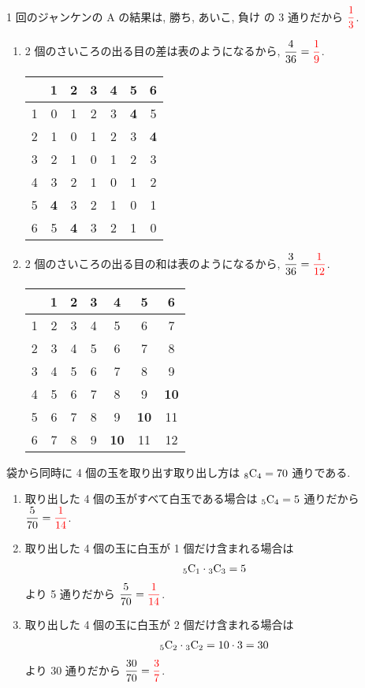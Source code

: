 1 回のジャンケンの A の結果は, 勝ち, あいこ, 負け の 3 通りだから $\textcolor{red}{\dfrac{1}{3}}$.

\begin{enumerate}
	\item{
		2 個のさいころの出る目の差は表のようになるから, $\dfrac{4}{36} = \textcolor{red}{\dfrac{1}{9}}$.
		\begin{table}[H]
			\centering
			\begin{tabular}{c|cccccc}
				  & 1 & 2 & 3 & 4 & 5 & 6 \\ \hline
				1 & 0 & 1 & 2 & 3 & {\textbf{4}} & 5 \\
				2 & 1 & 0 & 1 & 2 & 3 & {\textbf{4}} \\
				3 & 2 & 1 & 0 & 1 & 2 & 3 \\
				4 & 3 & 2 & 1 & 0 & 1 & 2 \\
				5 & {\textbf{4}} & 3 & 2 & 1 & 0 & 1 \\
				6 & 5 & {\textbf{4}} & 3 & 2 & 1 & 0
			\end{tabular}
		\end{table}
	}
	\item{
		2 個のさいころの出る目の和は表のようになるから, $\dfrac{3}{36} = \textcolor{red}{\dfrac{1}{12}}$.
		\begin{table}[H]
			\centering
			\begin{tabular}{c|cccccc}
				  & 1 & 2 & 3 & 4 & 5 & 6 \\ \hline
				1 & 2 & 3 & 4 & 5 & 6 & 7 \\
				2 & 3 & 4 & 5 & 6 & 7 & 8 \\
				3 & 4 & 5 & 6 & 7 & 8 & 9 \\
				4 & 5 & 6 & 7 & 8 & 9 & {\textbf{10}} \\
				5 & 6 & 7 & 8 & 9 & {\textbf{10}} & 11 \\
				6 & 7 & 8 & 9 & {\textbf{10}} & 11 & 12
			\end{tabular}
		\end{table}
	}
\end{enumerate}

袋から同時に 4 個の玉を取り出す取り出し方は ${{}_{8}\mathrm{C}_{4}} = 70$ 通りである.
\begin{enumerate}
	\item{
		取り出した 4 個の玉がすべて白玉である場合は ${{}_{5}\mathrm{C}_{4}} = 5$ 通りだから $\dfrac{5}{70} = \textcolor{red}{\dfrac{1}{14}}$.
	}
	\item{
		取り出した 4 個の玉に白玉が 1 個だけ含まれる場合は
		\begin{align}
			{{}_{5}\mathrm{C}_{1}}\cdot{{}_{3}\mathrm{C}_{3}} = 5
		\end{align}
		より 5 通りだから $\dfrac{5}{70} = \textcolor{red}{\dfrac{1}{14}}$.
	}
	\item{
		取り出した 4 個の玉に白玉が 2 個だけ含まれる場合は
		\begin{align}
			{{}_{5}\mathrm{C}_{2}}\cdot{{}_{3}\mathrm{C}_{2}} = 10\cdot3 = 30
		\end{align}
		より 30 通りだから $\dfrac{30}{70} = \textcolor{red}{\dfrac{3}{7}}$.
	}
\end{enumerate}


